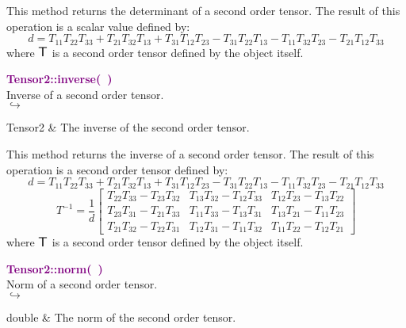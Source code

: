 This method returns the determinant of a second order tensor.
The result of this operation is a scalar value defined by:
\begin{equation*}
d = T_{11} T_{22} T_{33} + T_{21} T_{32} T_{13} + T_{31} T_{12} T_{23} - T_{31} T_{22} T_{13} - T_{11} T_{32} T_{23} - T_{21} T_{12} T_{33}
\end{equation*}
where $\mbox{\large\ensuremath{\mathsf{T}}}$ is a second order tensor defined by the object itself.

\textcolor{purple}{\textbf{Tensor2::inverse(~)}}\label{Tensor2::inverse()}\\
Inverse of a second order tensor.\\ \hspace*{5mm}$\hookrightarrow$
\vspace*{-2em}\begin{tcolorbox}[grow to left by=-1cm, width=\textwidth-1cm,myArgs,tabularx={l|R}]
Tensor2 & The inverse of the second order tensor.
\end{tcolorbox}

This method returns the inverse of a second order tensor.
The result of this operation is a second order tensor defined by:
\begin{equation*}
d = T_{11} T_{22} T_{33} + T_{21} T_{32} T_{13} + T_{31} T_{12} T_{23} - T_{31} T_{22} T_{13} - T_{11} T_{32} T_{23} - T_{21} T_{12} T_{33}
\end{equation*}
\begin{equation*}
T^{-1} = \frac {1}{d} \left[\begin{array}{ccc}
  T_{22}T_{33}-T_{23}T_{32}&T_{13}T_{32}-T_{12}T_{33}&T_{12}T_{23}-T_{13}T_{22}\\
  T_{23}T_{31}-T_{21}T_{33}&T_{11}T_{33}-T_{13}T_{31}&T_{13}T_{21}-T_{11}T_{23}\\
  T_{21}T_{32}-T_{22}T_{31}&T_{12}T_{31}-T_{11}T_{32}&T_{11}T_{22}-T_{12}T_{21}
  \end{array}
  \right]
\end{equation*}
where $\mbox{\large\ensuremath{\mathsf{T}}}$ is a second order tensor defined by the object itself.

\textcolor{purple}{\textbf{Tensor2::norm(~)}}\label{Tensor2::norm()}\\
Norm of a second order tensor.\\ \hspace*{5mm}$\hookrightarrow$
\vspace*{-2em}\begin{tcolorbox}[grow to left by=-1cm, width=\textwidth-1cm,myArgs,tabularx={l|R}]
double & The norm of the second order tensor.
\end{tcolorbox}

